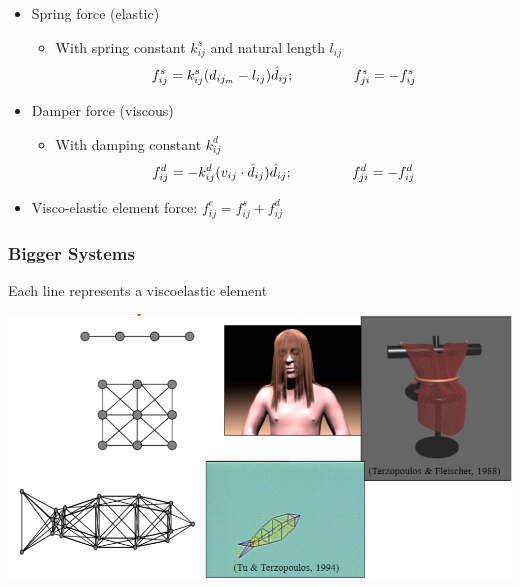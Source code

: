 \documentclass{article}
\begin{document}
\begin{itemize}
    \item Spring force (elastic)
    \begin{itemize}
        \item With spring constant $k_{ij}^s$ and natural length $l_{ij}$
        \[f_{ij}^s = k_{ij}^s(d_{ij_m} - l_{ij}) \hat d_{ij}; \hspace{1.5cm} f_{ji}^s = -f_{ij}^s\]
    \end{itemize}
    \item Damper force (viscous)
    \begin{itemize}
        \item With damping constant $k_{ij}^d$
        \[f_{ij}^d = -k_{ij}^d(v_{ij} \cdot \hat d_{ij}) \hat d_{ij}; \hspace{1.5cm} f_{ji}^d = -f_{ij}^d\]
    \end{itemize}
    \item Visco-elastic element force: $f_{ij}^e = f_{ij}^s + f_{ij}^d$
\end{itemize}

\pagebreak

\subsubsection*{Bigger Systems}
Each line represents a viscoelastic element
\begin{center}
    \includegraphics*[scale=0.8]{W5_3.png}
\end{center}
\end{document}
